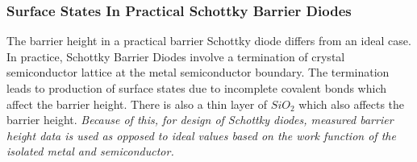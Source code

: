 \begin{frame}
  \frametitle{Surface States In Practical Schottky Barrier Diodes}
  The barrier height in a practical barrier Schottky diode differs from an ideal case. In practice, Schottky Barrier Diodes involve a termination of crystal semiconductor lattice at the metal semiconductor boundary. The termination leads to production of surface states due to incomplete covalent bonds which affect the barrier height. There is also a thin layer of $SiO_2$ which also affects the barrier height. \emph{Because of this, for design of Schottky diodes, measured barrier height data is used as opposed to ideal values based on the work function of the isolated metal and semiconductor.}
\end{frame}

